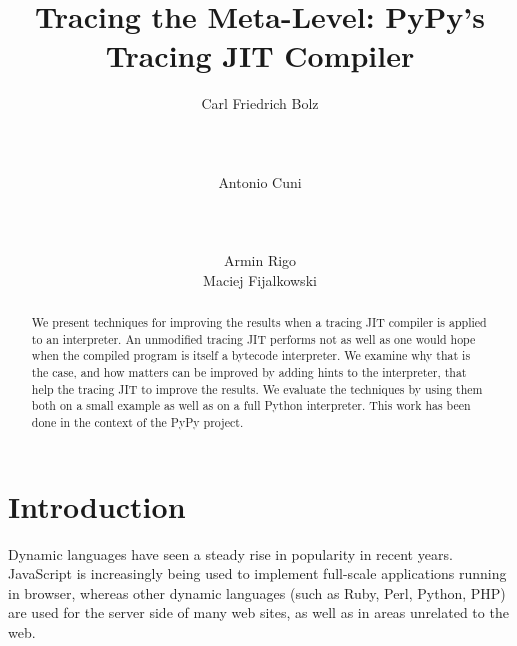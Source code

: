\documentclass{acm_proc_article-sp}
\begin{document}
\title{Tracing the Meta-Level: PyPy's Tracing JIT Compiler}

\author{
\alignauthor Carl Friedrich Bolz\\
       \\
       \\
       \\
\alignauthor Antonio Cuni\\
       \\
       \\
       \\
\alignauthor Armin Rigo\\
\alignauthor Maciej Fijalkowski\\
}
\maketitle



\begin{abstract}
We present techniques for improving the results when a tracing JIT compiler is
applied to an interpreter. An unmodified tracing JIT performs not as well as one
would hope when the compiled program is itself a bytecode interpreter. We
examine why that is the case, and how matters can be improved by adding hints to
the interpreter, that help the tracing JIT to improve the results. We evaluate
the techniques by using them both on a small example as well as on a full Python
interpreter. This work has been done in the context of the PyPy project.

\end{abstract}


\section{Introduction}

Dynamic languages have seen a steady rise in popularity in recent years.
JavaScript is increasingly being used to implement full-scale applications
running in browser, whereas other dynamic languages (such as Ruby, Perl, Python,
PHP) are used for the server side of many web sites, as well as in areas
unrelated to the web.
\end{document}
